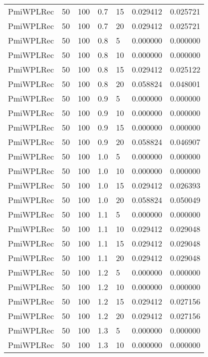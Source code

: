 \begin{tabular}{lllrlrr}
 PmiWPLRec &   50 &   100 &   0.7 &   15 &     0.029412 &  0.025721 \\
 PmiWPLRec &   50 &   100 &   0.7 &   20 &     0.029412 &  0.025721 \\
 PmiWPLRec &   50 &   100 &   0.8 &    5 &     0.000000 &  0.000000 \\
 PmiWPLRec &   50 &   100 &   0.8 &   10 &     0.000000 &  0.000000 \\
 PmiWPLRec &   50 &   100 &   0.8 &   15 &     0.029412 &  0.025122 \\
 PmiWPLRec &   50 &   100 &   0.8 &   20 &     0.058824 &  0.048001 \\
 PmiWPLRec &   50 &   100 &   0.9 &    5 &     0.000000 &  0.000000 \\
 PmiWPLRec &   50 &   100 &   0.9 &   10 &     0.000000 &  0.000000 \\
 PmiWPLRec &   50 &   100 &   0.9 &   15 &     0.000000 &  0.000000 \\
 PmiWPLRec &   50 &   100 &   0.9 &   20 &     0.058824 &  0.046907 \\
 PmiWPLRec &   50 &   100 &   1.0 &    5 &     0.000000 &  0.000000 \\
 PmiWPLRec &   50 &   100 &   1.0 &   10 &     0.000000 &  0.000000 \\
 PmiWPLRec &   50 &   100 &   1.0 &   15 &     0.029412 &  0.026393 \\
 PmiWPLRec &   50 &   100 &   1.0 &   20 &     0.058824 &  0.050049 \\
 PmiWPLRec &   50 &   100 &   1.1 &    5 &     0.000000 &  0.000000 \\
 PmiWPLRec &   50 &   100 &   1.1 &   10 &     0.029412 &  0.029048 \\
 PmiWPLRec &   50 &   100 &   1.1 &   15 &     0.029412 &  0.029048 \\
 PmiWPLRec &   50 &   100 &   1.1 &   20 &     0.029412 &  0.029048 \\
 PmiWPLRec &   50 &   100 &   1.2 &    5 &     0.000000 &  0.000000 \\
 PmiWPLRec &   50 &   100 &   1.2 &   10 &     0.000000 &  0.000000 \\
 PmiWPLRec &   50 &   100 &   1.2 &   15 &     0.029412 &  0.027156 \\
 PmiWPLRec &   50 &   100 &   1.2 &   20 &     0.029412 &  0.027156 \\
 PmiWPLRec &   50 &   100 &   1.3 &    5 &     0.000000 &  0.000000 \\
 PmiWPLRec &   50 &   100 &   1.3 &   10 &     0.000000 &  0.000000 \\

\end{tabular}
